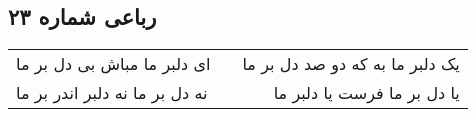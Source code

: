 \begin{center}
\section*{رباعی شماره ۲۳}
\label{sec:sh023}
\begin{longtable}{l p{0.5cm} r}
ای دلبر ما مباش بی دل بر ما
&&
یک دلبر ما به که دو صد دل بر ما
\\
نه دل بر ما نه دلبر اندر بر ما
&&
یا دل بر ما فرست یا دلبر ما
\\
\end{longtable}
\end{center}
